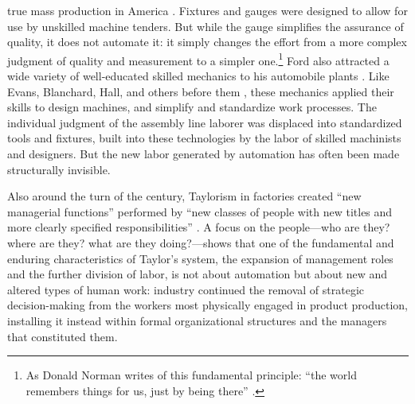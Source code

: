 true mass production in America \cite[p. 217]{hounshell}. Fixtures
and gauges were designed to allow for use by unskilled machine
tenders.
 But while the gauge simplifies the
assurance  of quality, it does not
automate it:  it simply changes the effort from a more complex judgment
of quality and measurement to a simpler one.\footnote{As Donald
Norman writes of this fundamental principle: ``the world remembers things for us, just by being
there'' \cite[p. 147]{normanThings}.} Ford also attracted a wide
variety of well-educated skilled mechanics 
to his automobile plants \cite[p. 223]{hounshell}. Like Evans, Blanchard, Hall, and others
before them \cite{roesmithHarpers}, these mechanics applied their skills to design machines,
and simplify and standardize work processes. The individual judgment
of the assembly line laborer was displaced into standardized tools and
fixtures, built into these technologies by the labor of skilled
machinists and designers. But the new labor generated by automation
has often
been made structurally invisible.


Also around the turn of the century, Taylorism in factories created ``new managerial
functions'' performed by ``new classes of people with new titles and
more clearly specified responsibilities'' \cite[p. 120]{aitken}. A focus on the
people---who are they? where are they? what are they doing?---shows that
one of the fundamental and enduring characteristics of Taylor's
system, the expansion of management roles and the further division of
labor, is not about automation but about new and altered
types of human work: industry continued
the removal of strategic decision-making from the
workers most physically engaged in product production, installing it
instead within formal organizational structures and the managers that
constituted them. 



